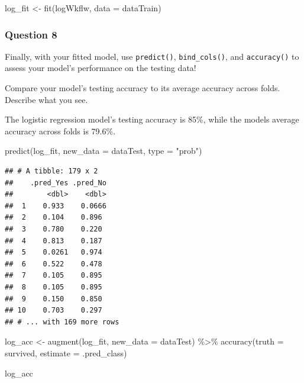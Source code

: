 \documentclass[
]{article}
\newenvironment{Shaded}{\begin{snugshade}}{\end{snugshade}}
\newcommand{\AttributeTok}[1]{\textcolor[rgb]{0.77,0.63,0.00}{#1}}
\newcommand{\FunctionTok}[1]{\textcolor[rgb]{0.00,0.00,0.00}{#1}}
\newcommand{\NormalTok}[1]{#1}
\newcommand{\OtherTok}[1]{\textcolor[rgb]{0.56,0.35,0.01}{#1}}
\newcommand{\SpecialCharTok}[1]{\textcolor[rgb]{0.00,0.00,0.00}{#1}}
\newcommand{\StringTok}[1]{\textcolor[rgb]{0.31,0.60,0.02}{#1}}
\begin{document}
\begin{Shaded}
\begin{Highlighting}[]
\NormalTok{log\_fit }\OtherTok{\textless{}{-}} \FunctionTok{fit}\NormalTok{(logWkflw, }\AttributeTok{data =}\NormalTok{ dataTrain)}
\end{Highlighting}
\end{Shaded}

\hypertarget{question-8}{%
\subsubsection{Question 8}\label{question-8}}

Finally, with your fitted model, use \texttt{predict()},
\texttt{bind\_cols()}, and \texttt{accuracy()} to assess your model's
performance on the testing data!

Compare your model's testing accuracy to its average accuracy across
folds. Describe what you see.

The logistic regression model's testing accuracy is 85\%, while the
models average accuracy across folds is 79.6\%.

\begin{Shaded}
\begin{Highlighting}[]
\FunctionTok{predict}\NormalTok{(log\_fit, }\AttributeTok{new\_data =}\NormalTok{ dataTest, }\AttributeTok{type =} \StringTok{"prob"}\NormalTok{)}
\end{Highlighting}
\end{Shaded}

\begin{verbatim}
## # A tibble: 179 x 2
##    .pred_Yes .pred_No
##        <dbl>    <dbl>
##  1    0.933    0.0666
##  2    0.104    0.896 
##  3    0.780    0.220 
##  4    0.813    0.187 
##  5    0.0261   0.974 
##  6    0.522    0.478 
##  7    0.105    0.895 
##  8    0.105    0.895 
##  9    0.150    0.850 
## 10    0.703    0.297 
## # ... with 169 more rows
\end{verbatim}

\begin{Shaded}
\begin{Highlighting}[]
\NormalTok{log\_acc }\OtherTok{\textless{}{-}} \FunctionTok{augment}\NormalTok{(log\_fit, }\AttributeTok{new\_data =}\NormalTok{ dataTest) }\SpecialCharTok{\%\textgreater{}\%}
  \FunctionTok{accuracy}\NormalTok{(}\AttributeTok{truth =}\NormalTok{ survived, }\AttributeTok{estimate =}\NormalTok{ .pred\_class)}

\NormalTok{log\_acc}
\end{Highlighting}
\end{Shaded}
\end{document}
